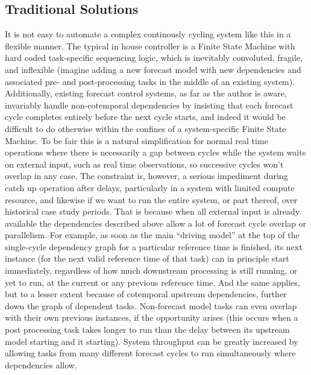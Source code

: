 \documentclass[11pt,a4paper]{article}
\begin{document}
\subsection{Traditional Solutions}

It is not easy to automate a complex continously cycling system like
this in a flexible manner. The typical in house controller is a Finite
State Machine with hard coded task-specific sequencing logic, which is
inevitably convoluted, fragile, and inflexible (imagine adding a new
forecast model with new dependencies and associated pre- and
post-processing tasks in the middle of an existing system).
Additionally, existing forecast control systems, as far as the author is
aware, invariably handle non-cotemporal dependencies by insisting that
each forecast cycle completes entirely before the next cycle starts, and
indeed it would be difficult to do otherwise within the confines of a
system-specific Finite State Machine. To be fair this is a natural
simplification for normal real time operations where there is
necessarily a gap between cycles while the system waits on external
input, such as real time observations, so successive cycles won't
overlap in any case.  The constraint is, however, a serious impediment
during catch up operation after delays, particularly in a system with
limited compute resource, and likewise if we want to run the entire
system, or part thereof, over historical case study periods. That is
because when all external input is already available the dependencies
described above allow a lot of forecast cycle overlap or parallelism.
For example, as soon as the main ``driving model'' at the top of the
single-cycle dependency graph for a particular reference time is
finished, its next instance (for the next valid reference time of that
task) can in principle start immediately, regardless of how much
downstream processing is still running, or yet to run, at the current or
any previous reference time.  And the same applies, but to a lesser
extent because of cotemporal upstream dependencies, further down the
graph of dependent tasks. Non-forecast model tasks can even overlap with
their own previous instances, if the opportunity arises (this occurs
when a post processing task takes longer to run than the delay between
its upstream model starting and it starting).  System throughput can be
greatly increased by allowing tasks from many different forecast cycles
to run simultaneously where dependencies allow.
\end{document}
